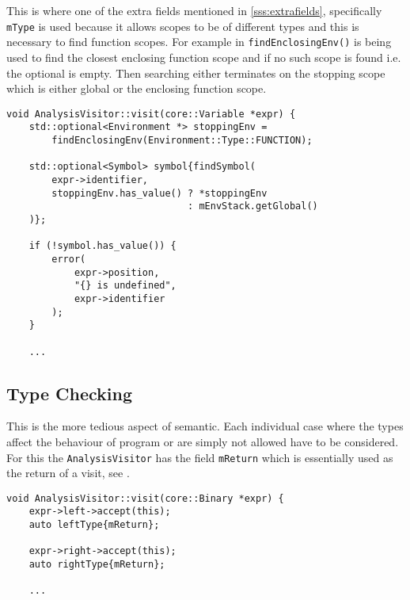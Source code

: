 This is where one of the extra fields mentioned in
\ref{sss:extrafields}, specifically \texttt{mType} is used
because it allows scopes to be of different types and this is
necessary to find function scopes. For example in
 \texttt{findEnclosingEnv()} is being
used to find the closest enclosing function scope and if no such
scope is found i.e. the optional is empty. Then searching either
terminates on the stopping scope which is either global or the
enclosing function scope.

\begin{lstlisting}[caption={The \texttt{visit(Variable *)}
method in the \texttt{AnalysisVisitor} class
(analysis/AnalysisVisitor.cpp)},label=lst:visitvariable]
void AnalysisVisitor::visit(core::Variable *expr) {
    std::optional<Environment *> stoppingEnv =
        findEnclosingEnv(Environment::Type::FUNCTION);

    std::optional<Symbol> symbol{findSymbol(
        expr->identifier,
        stoppingEnv.has_value() ? *stoppingEnv
                                : mEnvStack.getGlobal()
    )};

    if (!symbol.has_value()) {
        error(
            expr->position,
            "{} is undefined",
            expr->identifier
        );
    }

    ...
\end{lstlisting}

\subsection{Type Checking}

This is the more tedious aspect of semantic. Each individual
case where the types affect the behaviour of program or are
simply not allowed have to be considered. For this the
\texttt{AnalysisVisitor} has the field \texttt{mReturn} which is
essentially used as the return of a visit, see
.

\begin{lstlisting}[caption={A part of the \texttt{visit(Binary
*)} method in the \texttt{AnalysisVisitor} class
(analysis/AnalysisVisitor.cpp)},label=lst:binaryreturn]
void AnalysisVisitor::visit(core::Binary *expr) {
    expr->left->accept(this);
    auto leftType{mReturn};

    expr->right->accept(this);
    auto rightType{mReturn};

    ...
\end{lstlisting}

